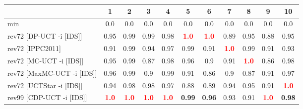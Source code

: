 \documentclass{article}
\begin{document}
\begin{tabular}{|l|r@{$\pm$}rr@{$\pm$}rr@{$\pm$}rr@{$\pm$}rr@{$\pm$}rr@{$\pm$}rr@{$\pm$}rr@{$\pm$}rr@{$\pm$}rr@{$\pm$}r|}
\hline

& \multicolumn{2}{c}{1}
& \multicolumn{2}{c}{2}
& \multicolumn{2}{c}{3}
& \multicolumn{2}{c}{4}
& \multicolumn{2}{c}{5}
& \multicolumn{2}{c}{6}
& \multicolumn{2}{c}{7}
& \multicolumn{2}{c}{8}
& \multicolumn{2}{c}{9}
& \multicolumn{2}{c|}{10}
\\
\hline
\hline
min
& \multicolumn{2}{c}{0.0}
& \multicolumn{2}{c}{0.0}
& \multicolumn{2}{c}{0.0}
& \multicolumn{2}{c}{0.0}
& \multicolumn{2}{c}{0.0}
& \multicolumn{2}{c}{0.0}
& \multicolumn{2}{c}{0.0}
& \multicolumn{2}{c}{0.0}
& \multicolumn{2}{c}{0.0}
& \multicolumn{2}{c|}{0.0}
\\
rev72 [DP-UCT -i [IDS]]
& \multicolumn{2}{c}{0.95}
& \multicolumn{2}{c}{0.99}
& \multicolumn{2}{c}{0.99}
& \multicolumn{2}{c}{0.98}
& \multicolumn{2}{c}{\textbf{\textcolor{red}{1.0}}}
& \multicolumn{2}{c}{\textbf{\textcolor{red}{1.0}}}
& \multicolumn{2}{c}{0.89}
& \multicolumn{2}{c}{0.95}
& \multicolumn{2}{c}{0.88}
& \multicolumn{2}{c|}{0.95}
\\
rev72 [IPPC2011]
& \multicolumn{2}{c}{0.91}
& \multicolumn{2}{c}{0.99}
& \multicolumn{2}{c}{0.94}
& \multicolumn{2}{c}{0.97}
& \multicolumn{2}{c}{0.99}
& \multicolumn{2}{c}{0.91}
& \multicolumn{2}{c}{\textbf{\textcolor{red}{1.0}}}
& \multicolumn{2}{c}{0.99}
& \multicolumn{2}{c}{0.91}
& \multicolumn{2}{c|}{0.93}
\\
rev72 [MC-UCT -i [IDS]]
& \multicolumn{2}{c}{0.95}
& \multicolumn{2}{c}{0.99}
& \multicolumn{2}{c}{0.87}
& \multicolumn{2}{c}{0.98}
& \multicolumn{2}{c}{0.96}
& \multicolumn{2}{c}{0.9}
& \multicolumn{2}{c}{0.91}
& \multicolumn{2}{c}{\textbf{\textcolor{red}{1.0}}}
& \multicolumn{2}{c}{0.86}
& \multicolumn{2}{c|}{0.98}
\\
rev72 [MaxMC-UCT -i [IDS]]
& \multicolumn{2}{c}{0.96}
& \multicolumn{2}{c}{0.99}
& \multicolumn{2}{c}{0.9}
& \multicolumn{2}{c}{0.99}
& \multicolumn{2}{c}{0.91}
& \multicolumn{2}{c}{0.86}
& \multicolumn{2}{c}{0.9}
& \multicolumn{2}{c}{0.87}
& \multicolumn{2}{c}{0.91}
& \multicolumn{2}{c|}{0.97}
\\
rev72 [UCTStar -i [IDS]]
& \multicolumn{2}{c}{0.94}
& \multicolumn{2}{c}{0.98}
& \multicolumn{2}{c}{0.98}
& \multicolumn{2}{c}{0.97}
& \multicolumn{2}{c}{0.88}
& \multicolumn{2}{c}{0.89}
& \multicolumn{2}{c}{0.94}
& \multicolumn{2}{c}{0.95}
& \multicolumn{2}{c}{0.91}
& \multicolumn{2}{c|}{\textbf{\textcolor{red}{1.0}}}
\\
\hline
rev99 [CDP-UCT -i [IDS]]
& \multicolumn{2}{c}{\textbf{\textcolor{red}{1.0}}}
& \multicolumn{2}{c}{\textbf{\textcolor{red}{1.0}}}
& \multicolumn{2}{c}{\textbf{\textcolor{red}{1.0}}}
& \multicolumn{2}{c}{\textbf{\textcolor{red}{1.0}}}
& \multicolumn{2}{c}{\textbf{0.99}}
& \multicolumn{2}{c}{\textbf{0.96}}
& \multicolumn{2}{c}{0.93}
& \multicolumn{2}{c}{0.91}
& \multicolumn{2}{c}{\textbf{\textcolor{red}{1.0}}}
& \multicolumn{2}{c|}{\textbf{0.98}}
\\
\hline
\end{tabular}%
\end{document}
